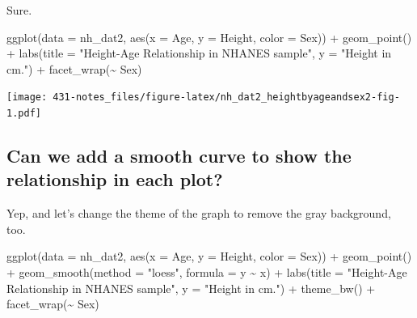 \documentclass[
]{book}
\newenvironment{Shaded}{\begin{snugshade}}{\end{snugshade}}
\newcommand{\AttributeTok}[1]{\textcolor[rgb]{0.77,0.63,0.00}{#1}}
\newcommand{\FunctionTok}[1]{\textcolor[rgb]{0.00,0.00,0.00}{#1}}
\newcommand{\NormalTok}[1]{#1}
\newcommand{\SpecialCharTok}[1]{\textcolor[rgb]{0.00,0.00,0.00}{#1}}
\newcommand{\StringTok}[1]{\textcolor[rgb]{0.31,0.60,0.02}{#1}}
\begin{document}
Sure.

\begin{Shaded}
\begin{Highlighting}[]
\FunctionTok{ggplot}\NormalTok{(}\AttributeTok{data =}\NormalTok{ nh\_dat2, }\FunctionTok{aes}\NormalTok{(}\AttributeTok{x =}\NormalTok{ Age, }\AttributeTok{y =}\NormalTok{ Height, }\AttributeTok{color =}\NormalTok{ Sex)) }\SpecialCharTok{+}
    \FunctionTok{geom\_point}\NormalTok{() }\SpecialCharTok{+} 
    \FunctionTok{labs}\NormalTok{(}\AttributeTok{title =} \StringTok{"Height{-}Age Relationship in NHANES sample"}\NormalTok{, }
         \AttributeTok{y =} \StringTok{"Height in cm."}\NormalTok{) }\SpecialCharTok{+}
    \FunctionTok{facet\_wrap}\NormalTok{(}\SpecialCharTok{\textasciitilde{}}\NormalTok{ Sex)}
\end{Highlighting}
\end{Shaded}

\texttt{[image: 431-notes\_files/figure-latex/nh\_dat2\_heightbyageandsex2-fig-1.pdf]}

\hypertarget{can-we-add-a-smooth-curve-to-show-the-relationship-in-each-plot}{%
\subsection{Can we add a smooth curve to show the relationship in each plot?}\label{can-we-add-a-smooth-curve-to-show-the-relationship-in-each-plot}}

Yep, and let's change the theme of the graph to remove the gray background, too.

\begin{Shaded}
\begin{Highlighting}[]
\FunctionTok{ggplot}\NormalTok{(}\AttributeTok{data =}\NormalTok{ nh\_dat2, }\FunctionTok{aes}\NormalTok{(}\AttributeTok{x =}\NormalTok{ Age, }\AttributeTok{y =}\NormalTok{ Height, }\AttributeTok{color =}\NormalTok{ Sex)) }\SpecialCharTok{+}
    \FunctionTok{geom\_point}\NormalTok{() }\SpecialCharTok{+} 
    \FunctionTok{geom\_smooth}\NormalTok{(}\AttributeTok{method =} \StringTok{"loess"}\NormalTok{, }\AttributeTok{formula =}\NormalTok{ y }\SpecialCharTok{\textasciitilde{}}\NormalTok{ x) }\SpecialCharTok{+}
    \FunctionTok{labs}\NormalTok{(}\AttributeTok{title =} \StringTok{"Height{-}Age Relationship in NHANES sample"}\NormalTok{, }
         \AttributeTok{y =} \StringTok{"Height in cm."}\NormalTok{) }\SpecialCharTok{+}
    \FunctionTok{theme\_bw}\NormalTok{() }\SpecialCharTok{+}
    \FunctionTok{facet\_wrap}\NormalTok{(}\SpecialCharTok{\textasciitilde{}}\NormalTok{ Sex)}
\end{Highlighting}
\end{Shaded}
\end{document}
